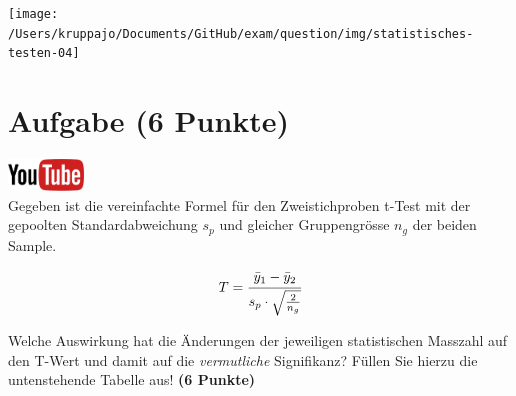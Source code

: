 \documentclass[a4paper, 10pt]{scrartcl}\usepackage[]{graphicx}\usepackage[]{xcolor}
\begin{document}
\begin{center}
  \texttt{[image: /Users/kruppajo/Documents/GitHub/exam/question/img/statistisches-testen-04]}
\end{center}


 
\clearpage

\section{Aufgabe \hfill (6 Punkte)}

\hfill\href{https://youtu.be/bc1m7rkXld4}{\includegraphics[width =
  2cm]{img/youtube}}\\[1Ex]

Gegeben ist die vereinfachte Formel f{\"u}r den Zweistichproben t-Test mit der
gepoolten Standardabweichung $s_p$ und gleicher Gruppengr{\"o}sse $n_g$ der
beiden Sample.

\begin{equation*}
  \label{eq:1}
  T = \cfrac{\bar{y}_1 - \bar{y}_2}{s_p \cdot \sqrt{\tfrac{2}{n_g}}}
\end{equation*}

Welche Auswirkung hat die {\"A}nderungen der jeweiligen statistischen Masszahl
auf den T-Wert und damit auf die \textit{vermutliche} Signifikanz? F{\"u}llen
Sie hierzu die untenstehende Tabelle aus! \textbf{(6 Punkte)}
\end{document}
